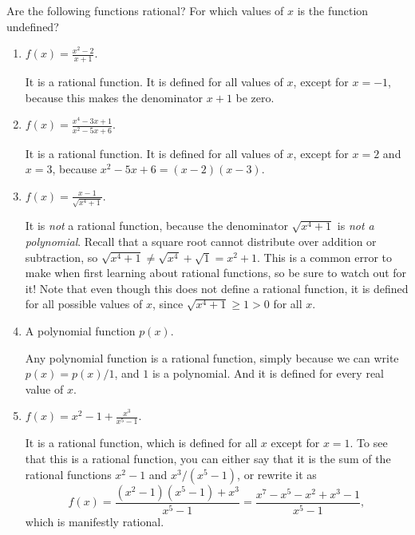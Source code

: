 \documentclass{ximera}
\begin{document}
\begin{example} Are the following functions rational? For which values of $x$ is the function undefined?
  \begin{enumerate}
  \item $f(x) = \frac{x^2-2}{x+1}$. \\[1em]
    \begin{explanation}
      It is a rational function. It is defined for all values of $x$, except for $x = -1$, because this makes the denominator $x+1$ be zero.
    \end{explanation}
  \item $f(x) = \frac{x^4-3x+1}{x^2-5x+6}$. \\[1em]
    \begin{explanation}
      It is a rational function. It is defined for all values of $x$, except for $x=2$ and $x=3$, because $x^2-5x+6 = (x-2)(x-3)$. 
    \end{explanation}
  \item $f(x) = \frac{x-1}{\sqrt{x^4+1}}$. \\[1em]
    \begin{explanation}
      It is \emph{not} a rational function, because the denominator $\sqrt{x^4+1}$ is \emph{not a polynomial}.  Recall that a square root cannot distribute over addition or subtraction, so $\sqrt{x^4+1} \neq \sqrt{x^4}+\sqrt{1} = x^2+1$.  This is a common error to make when first learning about rational functions, so be sure to watch out for it!  Note that even though this does not define a rational function, it is defined for all possible values of $x$, since $\sqrt{x^4+1} \geq 1 > 0$ for all $x$.
    \end{explanation}
  \item A polynomial function $p(x)$. \\[1em]
    \begin{explanation}
      Any polynomial function is a rational function, simply because we can write $p(x) = p(x)/1$, and $1$ is a polynomial. And it is defined for every real value of $x$.
    \end{explanation}
  \item $f(x) = x^2-1 + \frac{x^3}{x^5-1}$. \\[1em]
    \begin{explanation}
      It is a rational function, which is defined for all $x$ except for $x=1$. To see that this is a rational function, you can either say that it is the sum of the rational functions $x^2-1$ and $x^3/(x^5-1)$, or rewrite it as $$  f(x) = \frac{(x^2-1)(x^5-1) + x^3}{x^5-1} = \frac{x^7-x^5-x^2+x^3-1}{x^5-1},  $$which is manifestly rational.
    \end{explanation}
  \end{enumerate}
\end{example}
\end{document}
